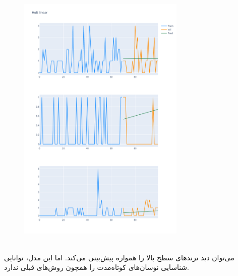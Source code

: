 \documentclass{article}
\begin{document}
\begin{figure}[hbt!]
	\centering
	\includegraphics[width=\textwidth,height=12cm]{Outputs/31.png}
\end{figure}
\ \\
می‌توان دید  ترندهای سطح بالا را همواره پیش‌بینی می‌کند. اما این مدل، توانایی شناسایی نوسان‌های کوتاه‌مدت را همچون روش‌های قبلی ندارد.
\end{document}

